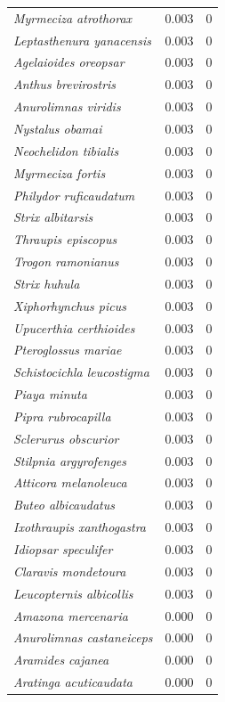 \documentclass[12pt,a4paper]{article}
\begin{document}
\begin{longtable}{p{6.2cm}cr}
  \textit{Myrmeciza atrothorax} & 0.003 & 0 \\
  \textit{Leptasthenura yanacensis} & 0.003 & 0 \\
  \textit{Agelaioides oreopsar} & 0.003 & 0 \\
  \textit{Anthus brevirostris} & 0.003 & 0 \\
  \textit{Anurolimnas viridis} & 0.003 & 0 \\
  \textit{Nystalus obamai} & 0.003 & 0 \\
  \textit{Neochelidon tibialis} & 0.003 & 0 \\
  \textit{Myrmeciza fortis} & 0.003 & 0 \\
  \textit{Philydor ruficaudatum} & 0.003 & 0 \\
  \textit{Strix albitarsis} & 0.003 & 0 \\
  \textit{Thraupis episcopus} & 0.003 & 0 \\
  \textit{Trogon ramonianus} & 0.003 & 0 \\
  \textit{Strix huhula} & 0.003 & 0 \\
  \textit{Xiphorhynchus picus} & 0.003 & 0 \\
  \textit{Upucerthia certhioides} & 0.003 & 0 \\
  \textit{Pteroglossus mariae} & 0.003 & 0 \\
  \textit{Schistocichla leucostigma} & 0.003 & 0 \\
  \textit{Piaya minuta} & 0.003 & 0 \\
  \textit{Pipra rubrocapilla} & 0.003 & 0 \\
  \textit{Sclerurus obscurior} & 0.003 & 0 \\
  \textit{Stilpnia argyrofenges} & 0.003 & 0 \\
  \textit{Atticora melanoleuca} & 0.003 & 0 \\
  \textit{Buteo albicaudatus} & 0.003 & 0 \\
  \textit{Ixothraupis xanthogastra} & 0.003 & 0 \\
  \textit{Idiopsar speculifer} & 0.003 & 0 \\
  \textit{Claravis mondetoura} & 0.003 & 0 \\
  \textit{Leucopternis albicollis} & 0.003 & 0 \\
  \textit{Amazona mercenaria} & 0.000 & 0 \\
  \textit{Anurolimnas castaneiceps} & 0.000 & 0 \\
  \textit{Aramides cajanea} & 0.000 & 0 \\
  \textit{Aratinga acuticaudata} & 0.000 & 0 \\

\end{longtable}
\end{document}
